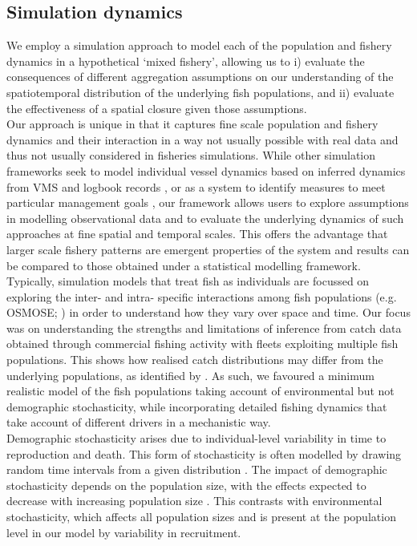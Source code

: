 \documentclass[preprint]{elsarticle}
\begin{document}
\subsection{Simulation dynamics}
 
We employ a simulation approach to model each of the population and fishery
dynamics in a hypothetical `mixed fishery', allowing us to i) evaluate the
consequences of different aggregation assumptions on our understanding of the
spatiotemporal distribution of the underlying fish populations, and ii)
evaluate the effectiveness of a spatial closure given those assumptions. \\

Our approach is unique in that it captures fine scale population and fishery
dynamics and their interaction in a way not usually possible with real data and
thus not usually considered in fisheries simulations. While other simulation
frameworks seek to model individual vessel dynamics based on inferred dynamics
from VMS and logbook records \citep{Bastardie2010}, or as a system to identify
measures to meet particular management goals \citep{Bailey2018}, our framework
allows users to explore assumptions in modelling observational data and to
evaluate the underlying dynamics of such approaches at fine spatial and
temporal scales. This offers the advantage that larger scale fishery
patterns are emergent properties of the system and results can be compared to
those obtained under a statistical modelling framework. \\

Typically, simulation models that treat fish as individuals are focussed on
exploring the inter- and intra- specific interactions among fish populations
(e.g. OSMOSE; \cite{Shin2004}) in order to understand how they vary over space
and time. Our focus was on understanding the strengths and limitations of
inference from catch data obtained through commercial fishing activity with
fleets exploiting multiple fish populations. This shows how realised catch
distributions may differ from the underlying populations, as identified by
\cite{Gillis2008}. As such, we favoured a minimum realistic model of the fish
populations \citep{Plaganyi2014} taking account of environmental but not
demographic stochasticity, while incorporating detailed fishing dynamics that
take account of different drivers in a mechanistic way.  \\ 

Demographic stochasticity arises due to individual-level variability in time to
reproduction and death. This form of stochasticity is often modelled by drawing
random time intervals from a given distribution \citep{Gillespie1977}. The
impact of demographic stochasticity depends on the population size, with the
effects expected to decrease with increasing population size \citep{Lande2010}.
This contrasts with environmental stochasticity, which affects all population
sizes and is present at the population level in our model by variability in
recruitment. \\
\end{document}
